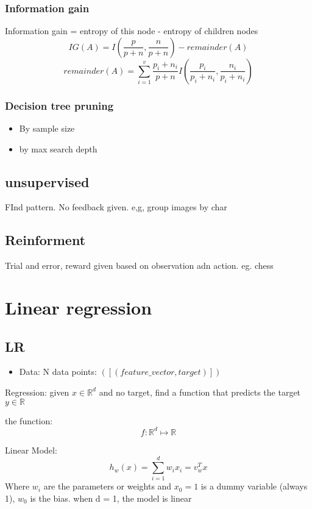 \documentclass{article}
\begin{document}
\subsubsection*{Information gain}
Information gain = entropy of this node - entropy of children nodes
\[IG(A) = I(\frac{p}{p + n}, \frac{n}{p + n}) - remainder(A)\]
\[remainder(A) = \sum_{i=1}^{v}\frac{p_i + n_i}{p + n}I(\frac{p_i}{p_i + n_i}, \frac{n_i}{p_i + n_i})\]
        

\subsubsection*{Decision tree pruning}
\begin{itemize}
    \item By sample size 
    \item by max search depth
\end{itemize}
\subsection{unsupervised}
FInd pattern. No feedback given. e,g, group images by char 
\subsection{Reinforment}
Trial and error, reward given based on observation adn action. eg. chess 










\section{Linear regression}
\subsection{LR}
\begin{itemize}
    \item Data: N data points: $([(feature\_vector, target)])$
\end{itemize}

Regression: given $x \in \mathbb{R}^d$ and no target, 
find a function that predicts the target $y \in \mathbb{R}$ 

the function:
\[f: \mathbb{R}^d \mapsto \mathbb{R}\]

Linear Model:
\[h_w(x) = \sum_{i=1}^{d} w_i x_i = v_w^Tx\]
Where $w_i$ are the parameters or weights and $x_0 = 1$ is a dummy variable (always 1), $w_0$ is the bias.
when d = 1, the model is linear
\end{document}
